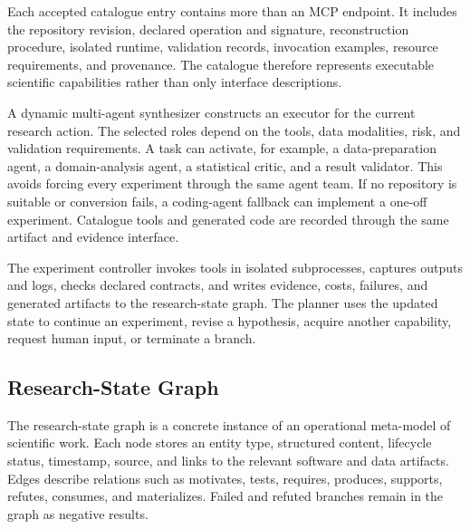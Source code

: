 \documentclass[letterpaper]{article} %
\begin{document}
Each accepted catalogue entry contains more than an MCP endpoint. It includes the repository revision, declared operation and signature, reconstruction procedure, isolated runtime, validation records, invocation examples, resource requirements, and provenance. The catalogue therefore represents executable scientific capabilities rather than only interface descriptions.

A dynamic multi-agent synthesizer constructs an executor for the current research action. The selected roles depend on the tools, data modalities, risk, and validation requirements. A task can activate, for example, a data-preparation agent, a domain-analysis agent, a statistical critic, and a result validator. This avoids forcing every experiment through the same agent team. If no repository is suitable or conversion fails, a coding-agent fallback can implement a one-off experiment. Catalogue tools and generated code are recorded through the same artifact and evidence interface.

The experiment controller invokes tools in isolated subprocesses, captures outputs and logs, checks declared contracts, and writes evidence, costs, failures, and generated artifacts to the research-state graph. The planner uses the updated state to continue an experiment, revise a hypothesis, acquire another capability, request human input, or terminate a branch.


\subsection{Research-State Graph}
\label{sec:rsg}

The research-state graph is a concrete instance of an operational meta-model of scientific work. Each node stores an entity type, structured content, lifecycle status, timestamp, source, and links to the relevant software and data artifacts. Edges describe relations such as motivates, tests, requires, produces, supports, refutes, consumes, and materializes. Failed and refuted branches remain in the graph as negative results.
\end{document}
